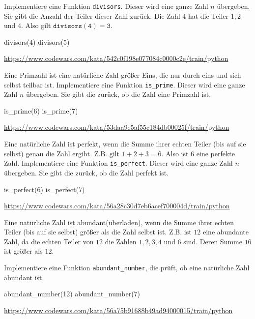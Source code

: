 \documentclass[class=scrartcl, crop=false]{standalone}
\begin{document}
\begin{aufgabe} \noindent
Implementiere eine Funktion \texttt{divisors}. Dieser wird eine ganze Zahl $n$ übergeben. 
Sie gibt die Anzahl der Teiler dieser Zahl zurück. Die Zahl $4$ hat die Teiler $1, 2$ und $4$. Also gilt $\mathtt{divisors(4) = 3}$.

\begin{pyconsole}
divisors(4)
divisors(5)
\end{pyconsole}

\noindent\url{https://www.codewars.com/kata/542c0f198e077084c0000c2e/train/python}

\end{aufgabe}

\begin{aufgabe} \noindent
Eine Primzahl ist eine natürliche Zahl größer Eins, die nur durch eins und sich selbst teilbar ist. 
Implementiere eine Funktion \texttt{is_prime}. Dieser wird eine ganze Zahl $n$ übergeben. 
Sie gibt die zurück, ob die Zahl eine Primzahl ist.

\begin{pyconsole}
is_prime(6)
is_prime(7)
\end{pyconsole}

\noindent\url{https://www.codewars.com/kata/53daa9e5af55c184db00025f/train/python}

\end{aufgabe}





\begin{aufgabe} \noindent
Eine natürliche Zahl ist perfekt, wenn die Summe ihrer echten Teiler (bis auf sie selbst) genau die Zahl ergibt.
Z.B. gilt $1 + 2 + 3 = 6$. Also ist $6$ eine perfekte Zahl.
Implementiere eine Funktion \texttt{is_perfect}. Dieser wird eine ganze Zahl $n$ übergeben. 
Sie gibt die zurück, ob die Zahl perfekt ist.

\begin{pyconsole}
is_perfect(6)
is_perfect(7)
\end{pyconsole}

\noindent\url{https://www.codewars.com/kata/56a28c30d7eb6acef700004d/train/python}

\end{aufgabe}


\begin{aufgabe} \noindent
Eine natürliche Zahl ist abundant(überladen), wenn die Summe ihrer echten Teiler (bis auf sie selbst) größer als die Zahl selbst ist. Z.B. ist $12$ eine abundante Zahl, da die echten Teiler von $12$ die Zahlen  $ 1, 2, 3,  4$ und $6$ sind. Deren Summe  $16$ ist größer als $12$. 

Implementiere eine Funktion \texttt{abundant_number}, die prüft, ob eine natürliche Zahl abundant ist. 
\begin{pyconsole}
abundant_number(12)
abundant_number(7)
\end{pyconsole}

\noindent\url{https://www.codewars.com/kata/56a75b91688b49ad94000015/train/python}

\end{aufgabe}
\end{document}
